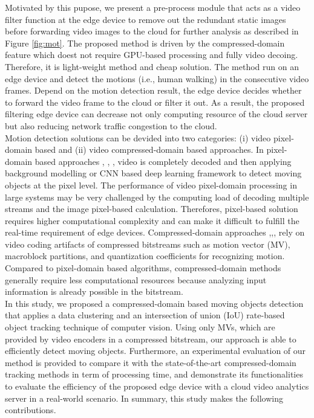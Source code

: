  Motivated by this pupose, we present a pre-process module that acts as a video filter function at the edge device to remove out the redundant static images before forwarding video images to the cloud for further analysis as described in Figure \ref{fig:mot}. The proposed method is driven by the compressed-domain feature which doest not require GPU-based processing and fully video decoing. Therefore, it is light-weight method and cheap solution. The  method run on an edge device and detect the motions (i.e., human walking) in the consecutive video frames. Depend on the motion detection result, the edge device decides whether to forward the video frame to the cloud or filter it out. As a result, the proposed filtering edge device can decrease not only computing resource of the cloud server but also reducing network traffic congestion to the cloud. \\
Motion detection solutions can be devided into two categories: (i) video pixel-domain based and (ii) video compressed-domain based approaches. In pixel-domain based approaches \cite{lu2014moving}, \cite{kumar2016segmentation}, \cite{gujrathi2014detecting}, \cite{wang2019ground} video is completely decoded and then applying background modelling or CNN based deep learning framework to detect moving objects at the pixel level. The performance of video pixel-domain processing in large systems may be very challenged by the computing load of decoding multiple streams and the image pixel-based calculation. Therefores, pixel-based solution requires higher computational complexity and can make it difficult to fulfill the real-time requirement of edge devices. 
Compressed-domain approaches \cite{favalli2000object},\cite{yoneyama1999moving},\cite{dong2006object},\cite{achanta2002compressed} rely on video coding artifacts of compressed bitstreams such as motion vector (MV), macroblock partitions, and quantization coefficients for recognizing motion. Compared to pixel-domain based algorithms, compressed-domain methods generally require less computational resources because analyzing input information is already possible in the bitstream.\\ In this study, we proposed a compressed-domain based moving objects detection that applies a data clustering and an intersection of union (IoU) rate-based object tracking technique of computer vision. Using only MVs, which are provided by video encoders in a compressed bitstream, our approach is able to efficiently detect moving objects. Furthermore, an experimental evaluation of our method is provided to compare it with the state-of-the-art compressed-domain tracking methods in term of processing time, and demonstrate its functionalities to evaluate the efficiency of the proposed edge device with a cloud video analytics server in a real-world scenario. In summary, this study makes the following contributions.
